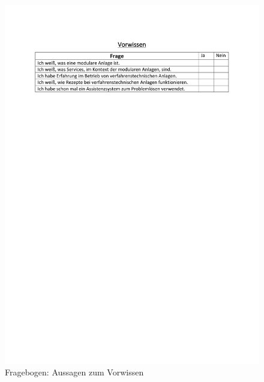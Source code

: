 \begin{figure}[h!]
\centering
\includegraphics[scale=0.71]{DA_files/Bilder/Anhang/Fragebogen-Vorwissen.pdf}
\caption{Fragebogen: Aussagen zum Vorwissen}
\end{figure}
